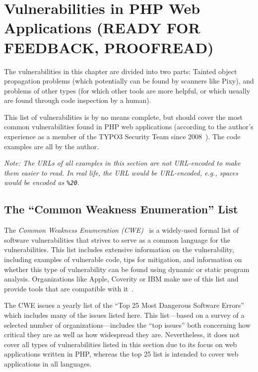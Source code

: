 \chapter{Vulnerabilities in PHP Web Applications (READY FOR FEEDBACK, PROOFREAD)}
\label{vulnerabilities}

The vulnerabilities in this chapter are divided into two parts: Tainted object propagation problems (which potentially can be found by scanners like Pixy), and problems of other types (for which other tools are more helpful, or which usually are found through code inspection by a human).

This list of vulnerabilities is by no means complete, but should cover the most common vulnerabilities found in PHP web applications (according to the author's experience as a member of the TYPO3 Security Team since 2008~\cite{security-team-members}). The code examples are all by the author.

\emph{Note: The URLs of all examples in this section are not URL-encoded to make them easier to read. In real life, the URL would be URL-encoded, e.g., spaces would be encoded as \texttt{\%20}.}

\section{The ``Common Weakness Enumeration'' List}
The \emph{Common Weakness Enumeration (CWE)}~\cite{cwe} is a widely-used formal list of software vulnerabilities that strives to serve as a common language for the vulnerabilities. This list includes extensive information on the vulnerability, including examples of vulnerable code, tips for mitigation, and information on whether this type of vulnerability can be found using dynamic or static program analysis. Organizations like Apple, Coverity or IBM make use of this list and provide tools that are compatible with it~\cite{cwe-organizations}.

The CWE issues a yearly list of the ``Top 25 Most Dangerous Software Errors''~\cite{cwe-top-25} which includes many of the issues listed here. This list---based on a survey of a selected number of organizations---includes the ``top issues'' both concerning how critical they are as well as how widespread they are. Nevertheless, it does not cover all types of vulnerabilities listed in this section due to its focus on web applications written in PHP, whereas the top 25 list is intended to cover web applications in all languages.


